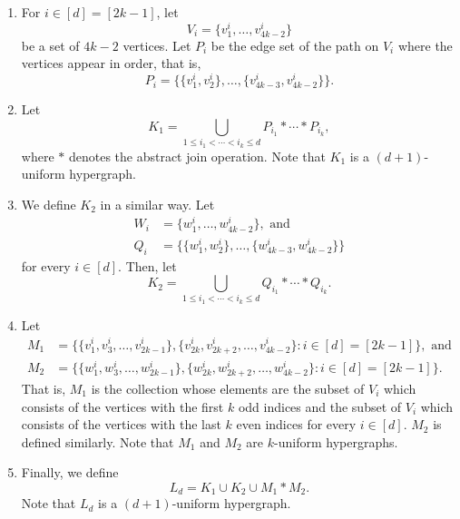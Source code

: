 \documentclass{article}
\theoremstyle{definition}
\begin{document}
\begin{enumerate}[(1)]
	\item For $i\in [d]=[2k-1]$, let
	$$V_i=\{v_1^i, \dots, v_{4k-2}^i\}$$
	be a set of $4k-2$ vertices. Let $P_i$ be the edge set of the path on $V_i$ where the vertices appear in order, that is,
	$$P_i=\{\{v_1^i,v_2^i\}, \dots, \{v_{4k-3}^i,v_{4k-2}^i\}\}.$$
	
	\item Let
	$$K_1=\bigcup_{1\leq i_1<\cdots <i_k\leq d}P_{i_1} * \cdots * P_{i_k},$$
	where $*$ denotes the abstract join operation.
	Note that $K_1$ is a $(d+1)$-uniform hypergraph.
	
	\item We define $K_2$ in a similar way. Let
	\begin{align*}
	W_i&=\{w_1^i, \dots, w_{4k-2}^i\}, \textrm{ and} \\
	Q_i&=\{\{w_1^i,w_2^i\}, \dots, \{w_{4k-3}^i,w_{4k-2}^i\}\}
	\end{align*}
	for every $i \in [d]$. Then, let
$$K_2=\bigcup_{1\leq i_1<\cdots <i_k\leq d}Q_{i_1} * \cdots * Q_{i_k}.$$
	
	\item Let
	\begin{align*}
	M_1&=\{\{v_1^i, v_3^i, \dots, v_{2k-1}^i\}, \{v_{2k}^i, v_{2k+2}^i, \dots, v_{4k-2}^i\}: i \in [d]=[2k-1]\}, \textrm{ and}\\
	M_2&=\{\{w_1^i, w_3^i, \dots, w_{2k-1}^i\}, \{w_{2k}^i, w_{2k+2}^i, \dots, w_{4k-2}^i\}: i \in [d]=[2k-1]\}.
	\end{align*}
	That is, $M_1$ is the collection whose elements are the subset of $V_i$ which consists of the vertices with the first $k$ odd indices and the subset of $V_i$ which consists of the vertices with the last $k$ even indices for every $i\in [d]$. $M_2$ is defined similarly. Note that $M_1$ and $M_2$ are $k$-uniform hypergraphs. 
	
	\item Finally, we define
	$$ L_d=K_1 \cup K_2 \cup M_1*M_2. $$
	Note that $L_d$ is a $(d+1)$-uniform hypergraph.
\end{enumerate}
\end{document}

